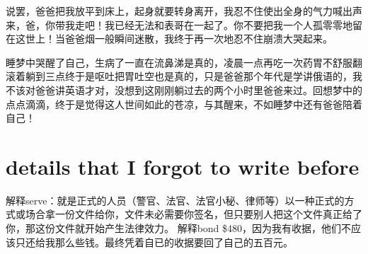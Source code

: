 \documentclass[12pt]{book}
\begin{document}
说罢，爸爸把我放平到床上，起身就要转身离开，我忍不住使出全身的气力喊出声来，爸，你带我走吧！我已经无法和表哥在一起了。你不要把我一个人孤零零地留在这世上！当爸爸烟一般瞬间迷散，我终于再一次地忍不住崩溃大哭起来。

睡梦中哭醒了自己，生病了一直在流鼻涕是真的，凌晨一点再吃一次药胃不舒服翻滚着躺到三点终于是呕吐把胃吐空也是真的，只是爸爸那个年代是学讲俄语的，我不该对爸爸讲英语才对，没想到这刚刚躺过去的两个小时里爸爸来过。回想梦中的点点滴滴，终于是觉得这人世间如此的苍凉，与其醒来，不如睡梦中还有爸爸陪着自己！

\chapter{details that I forgot to write before}
\label{sec-47}
解释serve：就是正式的人员（警官、法官、法官小秘、律师等）以一种正式的方式或场合拿一份文件给你，文件未必需要你签名，但只要别人把这个文件真正给了你，那这份文件就开始产生法律效力。
解释bond \$480，因为我有收据，他们不应该只还给我那么些钱。最终凭着自已的收据要回了自己的五百元。
\end{document}
